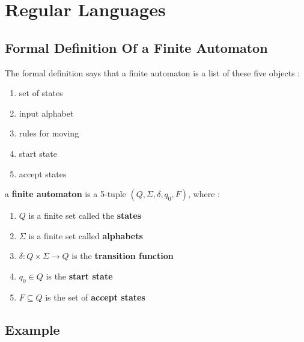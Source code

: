\documentclass[12pt]{article}
\begin{document}
\section{Regular Languages}


\subsection{Formal Definition Of a Finite Automaton}

The formal definition says that a finite automaton is a list of these five objects :

\begin{enumerate}
	\item set of states
	\item input alphabet
	\item rules for moving
	\item start state
	\item accept states
\end{enumerate}


\begin{tcolorbox}
a \textbf{finite automaton} is a 5-tuple $( Q, \Sigma , \delta , q_{0} , F )$, where :
\begin{enumerate}
	\item $Q$ is a finite set called the \textbf{states}
	\item $\Sigma$ is a finite set called \textbf{alphabets}
	\item $\delta : Q \times \Sigma \to Q$ is the \textbf{transition function}
	\item $q_{0} \in Q$ is the \textbf{start state}
	\item $F \subseteq Q$ is the set of \textbf{accept states}
\end{enumerate}
\end{tcolorbox}

\newpage

\subsection{Example}

\begin{center}
\end{center}
\end{document}
